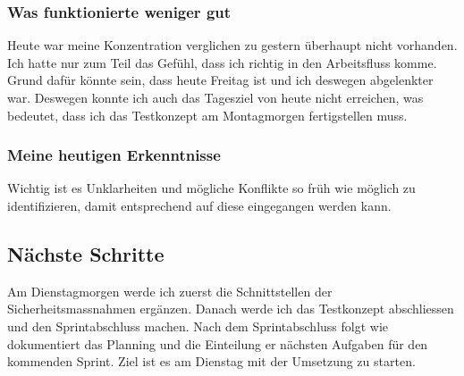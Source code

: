 \subsubsection*{Was funktionierte weniger gut}
Heute war meine Konzentration verglichen zu gestern überhaupt nicht vorhanden. Ich hatte nur zum Teil das Gefühl, dass ich richtig in den 
Arbeitsfluss komme. Grund dafür könnte sein, dass heute Freitag ist und ich deswegen abgelenkter war. Deswegen konnte ich auch das Tagesziel von heute nicht erreichen, was bedeutet,
dass ich das Testkonzept am Montagmorgen fertigstellen muss.

\subsubsection*{Meine heutigen Erkenntnisse}
Wichtig ist es Unklarheiten und mögliche Konflikte so früh wie möglich zu identifizieren, damit entsprechend auf diese eingegangen werden kann.

\subsection*{Nächste Schritte}
Am Dienstagmorgen werde ich zuerst die Schnittstellen der Sicherheitsmassnahmen ergänzen. Danach werde ich das Testkonzept abschliessen und den 
Sprintabschluss machen. Nach dem Sprintabschluss folgt wie dokumentiert das Planning und die Einteilung er nächsten Aufgaben für den kommenden Sprint.
Ziel ist es am Dienstag mit der Umsetzung zu starten.

\pagebreak
